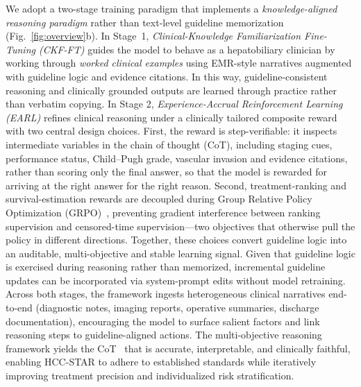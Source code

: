 \documentclass{article}
\begin{document}
We adopt a two-stage training paradigm that implements a \emph{knowledge-aligned reasoning paradigm} rather than text-level guideline memorization (Fig.~\ref{fig:overview}b). In Stage~1, \emph{Clinical-Knowledge Familiarization Fine-Tuning (CKF-FT)} guides the model to behave as a hepatobiliary clinician by working through \emph{worked clinical examples} using EMR-style narratives augmented with guideline logic and evidence citations. In this way, guideline-consistent reasoning and clinically grounded outputs are learned through practice rather than verbatim copying. In Stage 2, \emph{Experience-Accrual Reinforcement Learning (EARL)} refines clinical reasoning under a clinically tailored composite reward with two central design choices. First, the reward is step-verifiable: it inspects intermediate variables in the chain of thought (CoT), including staging cues, performance status, Child–Pugh grade, vascular invasion and evidence citations, rather than scoring only the final answer, so that the model is rewarded for arriving at the right answer for the right reason. Second, treatment-ranking and survival-estimation rewards are decoupled during Group Relative Policy Optimization (GRPO)~\cite{shao_deepseekmath_2024}, preventing gradient interference between ranking supervision and censored-time supervision—two objectives that otherwise pull the policy in different directions. Together, these choices convert guideline logic into an auditable, multi-objective and stable learning signal. Given that guideline logic is exercised during reasoning rather than memorized, incremental guideline updates can be incorporated via system-prompt edits without model retraining. Across both stages, the framework ingests heterogeneous clinical narratives end-to-end (diagnostic notes, imaging reports, operative summaries, discharge documentation), encouraging the model to surface salient factors and link reasoning steps to guideline-aligned actions. The multi-objective reasoning framework yields the CoT~\cite{cot} that is accurate, interpretable, and clinically faithful, enabling HCC-STAR to adhere to established standards while iteratively improving treatment precision and individualized risk stratification.
\end{document}
